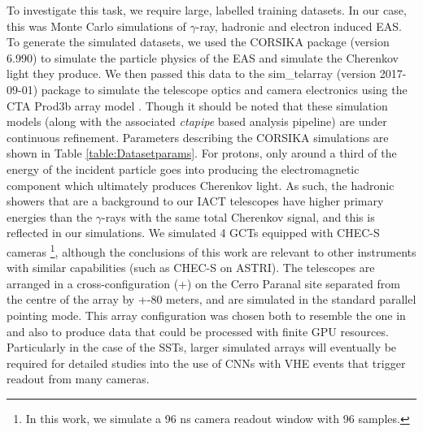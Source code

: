 To investigate this task, we require large, labelled training datasets. In our case, this was Monte Carlo simulations of $\gamma$-ray, hadronic and electron induced EAS. To generate the simulated datasets, we used the CORSIKA package (version 6.990) \cite{corsika} to simulate the particle physics of the EAS and simulate the Cherenkov light they produce. We then passed this data to the sim\_telarray (version 2017-09-01) package \cite{BERNLOHR} to simulate the telescope optics and camera electronics using the CTA Prod3b array model \cite{prod3b}. Though it should be noted that these simulation models (along with the associated \textit{ctapipe} based analysis pipeline) are under continuous refinement. Parameters describing the CORSIKA simulations are shown in Table \ref{table:Datasetparams}. For protons, only around a third of the energy of the incident particle goes into producing the electromagnetic component which ultimately produces Cherenkov light. As such, the hadronic showers that are a background to our IACT telescopes have higher primary energies than the $\gamma$-rays with the same total Cherenkov signal, and this is reflected in our simulations. We simulated 4 GCTs \cite{gct} equipped with CHEC-S cameras \footnote{In this work, we simulate a 96 ns camera readout window with 96 samples.}, although the conclusions of this work are relevant to other instruments with similar capabilities (such as CHEC-S on ASTRI). The telescopes are arranged in a cross-configuration (+) on the Cerro Paranal site separated from the centre of the array by +-80 meters, and are simulated in the standard parallel pointing mode. This array configuration was chosen both to resemble the one in \cite{Shilon} and also to produce data that could be processed with finite GPU resources. Particularly in the case of the SSTs, larger simulated arrays will eventually be required for detailed studies into the use of CNNs with VHE events that trigger readout from many cameras.

